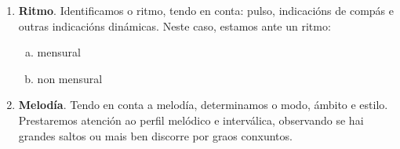 \begin{multicols}{2}

%
%
%
%
%
%
%
    \begin{enumerate}[1.-]
        \item %
        \textbf{Ritmo}. Identificamos o ritmo, tendo en conta: pulso, indicacións de compás e outras indicacións dinámicas. 
        Neste caso, estamos ante un ritmo:
        \begin{enumerate}[a)]
            \item mensural 
            \item non mensural 
        \end{enumerate}
        \item %
        \textbf{Melodía}. Tendo en conta a melodía, determinamos o modo, ámbito e estilo. Prestaremos atención ao perfil melódico e interválica, observando se hai grandes saltos ou mais ben discorre por graos conxuntos.

\end{enumerate}
\end{multicols}
